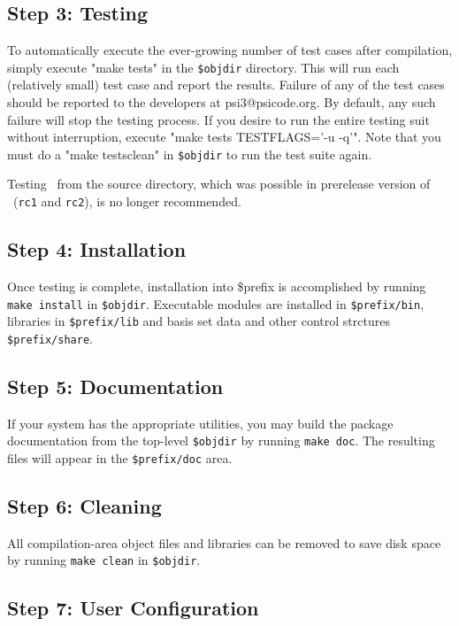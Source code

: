 \documentclass[12pt]{article}
\begin{document}
\subsection{Step 3: Testing}

To automatically execute the ever-growing number of test cases after
compilation, simply execute "make tests" in the {\tt \$objdir} directory.
This will run each (relatively small) test case and report the results.
Failure of any of the test cases should be reported to the developers at
psi3@psicode.org. By default, any such failure will stop the testing process.
If you desire to run the entire testing suit without interruption, execute
"make tests TESTFLAGS='-u -q'". Note that you must do a "make testsclean" in 
{\tt \$objdir} to run the test suite again.

Testing \PSIthree\ from the source directory, which was possible in
prerelease version of \PSIthree\ ({\tt rc1} and {\tt rc2}), is no longer
recommended.

\subsection{Step 4: Installation}

Once testing is complete, installation into \$prefix is accomplished by
running {\tt make install} in {\tt \$objdir}.   Executable modules are
installed in {\tt \$prefix/bin}, libraries in {\tt \$prefix/lib} and basis 
set data and other control strctures {\tt \$prefix/share}.

\subsection{Step 5: Documentation}

If your system has the appropriate utilities, you may build the package
documentation from the top-level {\tt \$objdir} by running {\tt make doc}.  
The resulting files will appear in the {\tt \$prefix/doc} area.

\subsection{Step 6: Cleaning}

All compilation-area object files and libraries can be removed to save
disk space by running {\tt make clean} in {\tt \$objdir}.

\subsection{Step 7: User Configuration}
\end{document}
